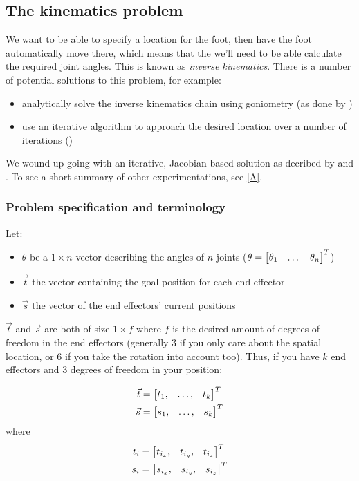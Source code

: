 \documentclass[a4paper]{article}
\begin{document}
\subsection{The kinematics problem}
\label{sec:ik}
We want to be able to specify a location for the foot, then have the foot
automatically move there, which means that the we'll need to be able calculate
the required joint angles. This is known as \emph{inverse kinematics}. There is
a number of potential solutions to this problem, for example: 
\begin{itemize}
\item analytically solve the inverse kinematics chain using goniometry (as done by \cite{Graf2009})
\item use an iterative algorithm to approach the desired location over a number
  of iterations (\cite{Buss2009})
\end{itemize}

We wound up going with an iterative, Jacobian-based solution as decribed by
\cite{Meredith2004} and \cite{Buss2009}. To see a short summary of other
experimentations, see \ref{A}.

\subsubsection{Problem specification and terminology}
Let:
\begin{itemize}
    \item $\theta$ be a $1 \times n$ vector describing the angles of $n$ joints
        ($\theta = \begin{bmatrix} \theta_1 & \dots & \theta_n \end{bmatrix}^T$)
    \item $\vec{t}$ the vector containing the goal position for each end effector
    \item $\vec{s}$ the vector of the end effectors' current positions
\end{itemize}

$\vec{t}$ and $\vec{s}$ are both of size $1 \times f$ where $f$ is the
desired amount of degrees of freedom in the end effectors (generally 3
if you only care about the spatial location, or 6 if you take the
rotation into account too).  Thus, if you have $k$ end effectors and 3
degrees of freedom in your position:

\begin{align*}
    \vec{t} &= \begin{bmatrix} t_1, &\dots, &t_k \end{bmatrix}^T \\
    \vec{s} &= \begin{bmatrix} s_1, &\dots, &s_k \end{bmatrix}^T
\end{align*}
where
\begin{align*}
    t_i &= \begin{bmatrix} t_{i_{x}}, &t_{i_{y}}, &t_{i_{z}} \end{bmatrix}^T \\
    s_i &= \begin{bmatrix} s_{i_{x}}, &s_{i_{y}}, &s_{i_{z}} \end{bmatrix}^T
\end{align*}
\end{document}
